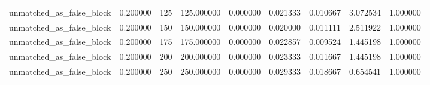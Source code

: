 \begin{tabular}{lrrrrrrrr}
unmatched_as_false_block & 0.200000 & 125 & 125.000000 & 0.000000 & 0.021333 & 0.010667 & 3.072534 & 1.000000 \\
unmatched_as_false_block & 0.200000 & 150 & 150.000000 & 0.000000 & 0.020000 & 0.011111 & 2.511922 & 1.000000 \\
unmatched_as_false_block & 0.200000 & 175 & 175.000000 & 0.000000 & 0.022857 & 0.009524 & 1.445198 & 1.000000 \\
unmatched_as_false_block & 0.200000 & 200 & 200.000000 & 0.000000 & 0.023333 & 0.011667 & 1.445198 & 1.000000 \\
unmatched_as_false_block & 0.200000 & 250 & 250.000000 & 0.000000 & 0.029333 & 0.018667 & 0.654541 & 1.000000 \\
\bottomrule
\end{tabular}
